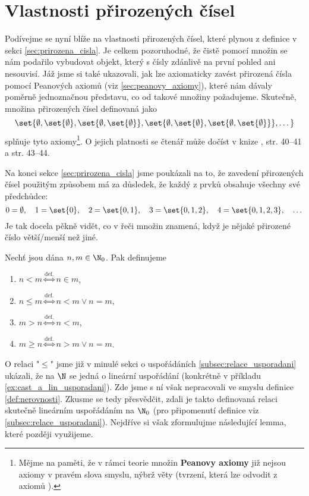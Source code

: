 \section{Vlastnosti přirozených čísel}\label{sec:vlastnosti_prirozenych_cisel}
Podívejme se nyní blíže na vlastnosti přirozených čísel, které plynou z definice v sekci \ref{sec:prirozena_cisla}. Je celkem pozoruhodné, že čistě pomocí množin se nám podařilo vybudovat objekt, který s čísly zdánlivě na první pohled ani nesouvisí. Jáž jsme si také ukazovali, jak lze axiomaticky zavést přirozená čísla pomocí Peanových axiomů (viz \ref{sec:peanovy_axiomy}), které nám dávaly poměrně jednoznačnou představu, co od takové množiny požadujeme. Skutečně, množina přirozených čísel definovaná jako
\begin{equation*}
    \set{\emptyset,\set{\emptyset},\set{\emptyset,\set{\emptyset}},\set{\emptyset,\set{\emptyset},\set{\emptyset,\set{\emptyset}}},\dots}
\end{equation*}
splňuje tyto axiomy\footnote{Mějme na paměti, že v rámci teorie množin \textbf{Peanovy axiomy} již nejsou axiomy v pravém slova smyslu, nýbrž věty (tvrzení, která lze odvodit z axiomů \ZF).}. O jejich platnosti se čtenář může dočíst v knize \cite{Goldrei2017}, str. 40--41 a str. 43--44.\par
Na konci sekce \ref{sec:prirozena_cisla} jsme poukázali na to, že zavedení přirozených čísel použitým způsobem má za důsledek, že každý z prvků obsahuje všechny své předchůdce:
\begin{equation*}
    0=\emptyset,\quad 1=\set{0},\quad 2=\set{0,1},\quad 3=\set{0,1,2},\quad 4=\set{0,1,2,3},\quad\dots
\end{equation*}
Je tak docela pěkně vidět, co v řeči množin znamená, když je nějaké přirozené číslo větší/menší než jiné.
\begin{definition}\label{def:nerovnosti}
    Nechť jsou dána $n,m\in\N_0$. Pak definujeme
    \begin{enumerate}[label=(\roman*)]
        \item $n<m\stackrel{\text{def.}}{\iff}n\in m$,
        \item $n\leq m\stackrel{\text{def.}}{\iff}n<m\lor n=m$,
        \item $m>n\stackrel{\text{def.}}{\iff}n<m$,
        \item $m\geq n\stackrel{\text{def.}}{\iff}n>m\lor n=m$.
    \end{enumerate}
\end{definition}
O relaci "$\leq$" jsme již v minulé sekci o uspořádáních \ref{subsec:relace_usporadani} ukázali, že na $\N$ se jedná o lineární uspořádání (konkrétně v příkladu \ref{ex:cast_a_lin_usporadani}). Zde jsme s ní však nepracovali ve smyslu definice \ref{def:nerovnosti}. Zkusme se tedy přesvědčit, zdali je takto definovaná relaci skutečně lineárním uspořádáním na $\N_0$ (pro připomenutí definice viz \ref{subsec:relace_usporadani}). Nejdříve si však zformulujme následující lemma, které později využijeme.
